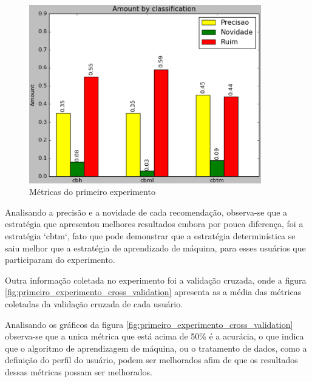 \begin{figure}[h]
  \centering
  \includegraphics[width=0.9\textwidth]{figuras/metricas_primeiro_experimento.eps}
  \caption{Métricas do primeiro experimento}
  \label{fig:metricas_primeiro_experimento}
\end{figure}

Analisando a precisão e a novidade de cada recomendação, observa-se que a
estratégia que apresentou melhores resultados embora por pouca diferença,
foi a estratégia `cbtm`, fato que pode demonstrar que a estratégia
determinística se saiu melhor que a estratégia de aprendizado de máquina, para
esses usuários que participaram do experimento.

Outra informação coletada no experimento foi a validação cruzada, onde a
figura \ref{fig:primeiro_experimento_cross_validation} apresenta as a média
das métricas coletadas da validação cruzada de cada usuário.

Analisando os gráficos da figura \ref{fig:primeiro_experimento_cross_validation}
observa-se que a unica métrica que está acima de 50\% é a acurácia, o que
indica que o algoritmo de aprendizagem de máquina, ou o tratamento de dados,
como a definição do perfil do usuário, podem ser melhorados afim de que os
resultados dessas métricas possam ser melhorados.

\pagebreak

